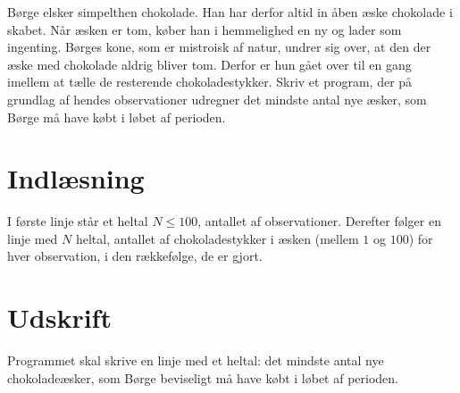 Børge elsker simpelthen chokolade.
Han har derfor altid in åben æske chokolade i skabet.
Når æsken er tom, køber han i hemmelighed en ny og lader som ingenting.
Børges kone, som er mistroisk af natur, undrer sig over, at den der æske med chokolade aldrig bliver tom.
Derfor er hun gået over til en gang imellem at tælle de resterende chokoladestykker. 
Skriv et program, der på grundlag af hendes observationer udregner det mindste antal nye æsker, som Børge må have købt i løbet af perioden.

\section*{Indlæsning}
I første linje står et heltal $N \le 100$, antallet af observationer.
Derefter følger en linje med $N$ heltal, antallet af chokoladestykker i æsken (mellem $1$ og $100$) for hver observation, i den rækkefølge, de er gjort.

\section*{Udskrift}
Programmet skal skrive en linje med et heltal: det mindste antal nye chokoladeæsker, som Børge beviseligt må have købt i løbet af perioden.
